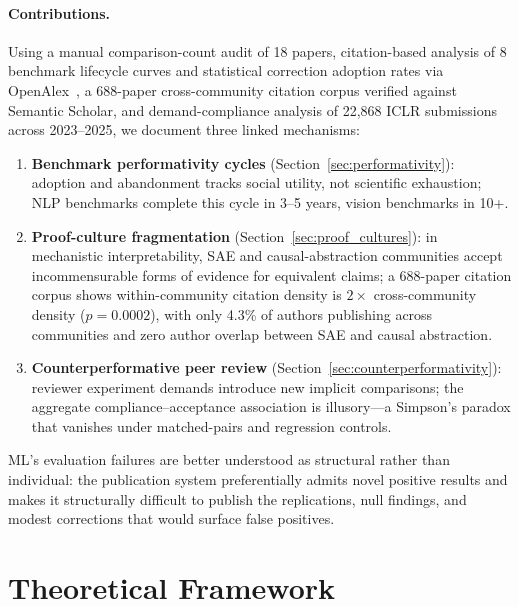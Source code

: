 \documentclass{article}
\begin{document}
\paragraph{Contributions.} Using a manual comparison-count audit of 18 papers, citation-based analysis of 8 benchmark lifecycle curves and statistical correction adoption rates via OpenAlex~\citep{priem_openalex_2022}, a 688-paper cross-community citation corpus verified against Semantic Scholar, and demand-compliance analysis of 22,868 ICLR submissions across 2023--2025, we document three linked mechanisms:

\begin{enumerate}[leftmargin=*]
\item \textbf{Benchmark performativity cycles} (Section~\ref{sec:performativity}): adoption and abandonment tracks social utility, not scientific exhaustion; NLP benchmarks complete this cycle in 3--5 years, vision benchmarks in 10+.
\item \textbf{Proof-culture fragmentation} (Section~\ref{sec:proof_cultures}): in mechanistic interpretability, SAE and causal-abstraction communities accept incommensurable forms of evidence for equivalent claims; a 688-paper citation corpus shows within-community citation density is $2{\times}$ cross-community density ($p = 0.0002$), with only 4.3\% of authors publishing across communities and zero author overlap between SAE and causal abstraction.
\item \textbf{Counterperformative peer review} (Section~\ref{sec:counterperformativity}): reviewer experiment demands introduce new implicit comparisons; the aggregate compliance--acceptance association is illusory---a Simpson's paradox that vanishes under matched-pairs and regression controls.
\end{enumerate}

ML's evaluation failures are better understood as structural rather than individual: the publication system preferentially admits novel positive results and makes it structurally difficult to publish the replications, null findings, and modest corrections that would surface false positives.

\section{Theoretical Framework}
\label{sec:theory}
\end{document}
